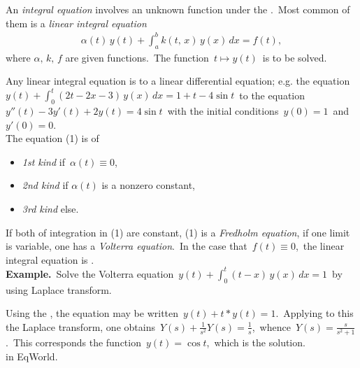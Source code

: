 \documentclass[12pt]{article}
\theoremstyle{definition}
\begin{document}
An {\em integral equation} involves an unknown function under the .\, Most common of them is a {\em linear integral equation}
\begin{align}
\alpha(t)\,y(t)+\!\int_a^bk(t,\,x)\,y(x)\,dx = f(t),
\end{align}
where $\alpha,\,k,\,f$ are given functions.\, The function\, $t \mapsto y(t)$\, is to be solved.

Any linear integral equation is  to a linear differential equation; e.g. the equation\, $\displaystyle y(t)\!+\!\int_0^t(2t-2x-3)\,y(x)\,dx = 1+t-4\sin{t}$\, to the equation\, $y''(t)-3y'(t)+2y(t) = 4\sin{t}$\, with the initial conditions \,$y(0) = 1$\, and\, $y'(0) = 0$.\\

The equation (1) is of
\begin{itemize}
\item {\em 1st kind} if\, $\alpha(t) \equiv 0$,
\item {\em 2nd kind} if $\alpha(t)$ is a nonzero constant,
\item {\em 3rd kind} else.
\end{itemize}

If both  of integration in (1) are constant, (1) is a {\em Fredholm equation}, if one limit is variable, one has a {\em Volterra equation}.\, In the case that\, $f(t) \equiv 0$,\, the linear integral equation is .\\

\textbf{Example.}\, Solve the Volterra equation\, $\displaystyle y(t)\!+\!\int_0^t(t\!-\!x)\,y(x)\,dx = 1$\, by using Laplace transform.

Using the , the equation may be written\, $y(t)+t*y(t) = 1$.\, Applying to this the Laplace transform, one obtains\, $\displaystyle Y(s)+\frac{1}{s^2}Y(s) = \frac{1}{s}$,\, whence\, $\displaystyle Y(s) = \frac{s}{s^2+1}$.\, This corresponds the function \,$y(t) = \cos{t}$,\, which is the solution.\\



 in EqWorld.
\end{document}
